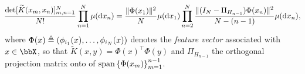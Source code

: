 \documentclass[twoside,11pt]{article}
\begin{document}
        \begin{equation}
        \label{eq:joint_distribution}\\
        \!
        \frac{\det[\widetilde K(x_m,x_n)]_{m,n=1}^N}{N!}
            \prod_{n=1}^N \mu(\mathop{}\!\mathrm{d} x_n)
        =
                \frac{\|\Phi(x_1)\|^2}{N}
            \mu(\mathop{}\!\mathrm{d} x_1)
            \prod_{n=2}^{N}
                \frac{\| (I_N-\Pi_{H_{n-1}}) \Phi(x_n)\|^2}{N-(n-1)}
                \mu(\mathop{}\!\mathrm{d} x_n),
        \!
        \end{equation}
        where
        $\Phi(x) \triangleq \left( \phi_{i_1}(x),\dots,\phi_{i_N}(x) \right)$
        denotes the \emph{feature vector} associated with $x\in\bbX$,
        so that
        $\tilde{K}(x,y) = \Phi(x)^{\top} \Phi(y)$
        and
        $\Pi_{H_{n-1}}$ the orthogonal projection matrix onto of
        $\operatorname{span}\left\{ \Phi(x_m) \right\}_{m=1}^{n-1}$.
\end{document}
